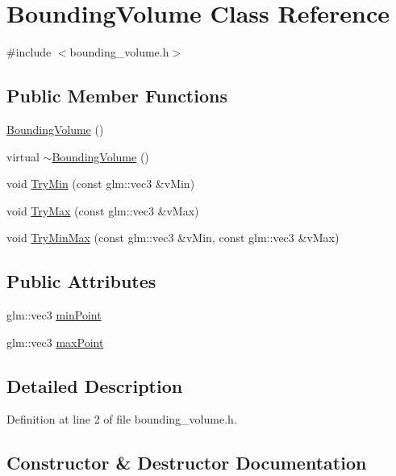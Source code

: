 \hypertarget{class_bounding_volume}{}\section{Bounding\+Volume Class Reference}
\label{class_bounding_volume}


{\ttfamily \#include $<$bounding\+\_\+volume.\+h$>$}

\subsection*{Public Member Functions}
\begin{DoxyCompactItemize}
\item 
\hyperlink{class_bounding_volume_a36262cdfae5d6ba1fef969cc355e450e}{Bounding\+Volume} ()
\item 
virtual \hyperlink{class_bounding_volume_a53b1de0ad46d8f427e47686d7e25cdef}{$\sim$\+Bounding\+Volume} ()
\item 
void \hyperlink{class_bounding_volume_a88542741ede8f3b9c7e5b912616e0e0d}{Try\+Min} (const glm\+::vec3 \&v\+Min)
\item 
void \hyperlink{class_bounding_volume_a64d2f4a5bec29528f9db1772a5627a65}{Try\+Max} (const glm\+::vec3 \&v\+Max)
\item 
void \hyperlink{class_bounding_volume_ae69df4359a1b6d3ffe33edb5cdfd1d0c}{Try\+Min\+Max} (const glm\+::vec3 \&v\+Min, const glm\+::vec3 \&v\+Max)
\end{DoxyCompactItemize}
\subsection*{Public Attributes}
\begin{DoxyCompactItemize}
\item 
glm\+::vec3 \hyperlink{class_bounding_volume_a51528200bd834159d593a7bb6b78b8df}{min\+Point}
\item 
glm\+::vec3 \hyperlink{class_bounding_volume_a39b83fb24ed67ad75a40f11a5c292217}{max\+Point}
\end{DoxyCompactItemize}


\subsection{Detailed Description}


Definition at line 2 of file bounding\+\_\+volume.\+h.



\subsection{Constructor \& Destructor Documentation}
\hypertarget{class_bounding_volume_a36262cdfae5d6ba1fef969cc355e450e}{}
